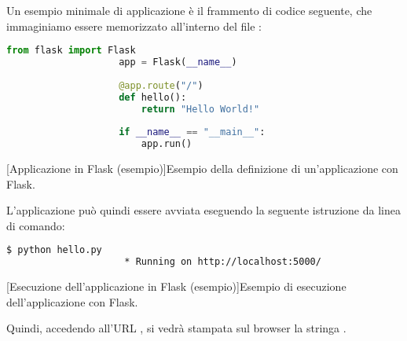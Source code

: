             Un esempio minimale di applicazione è il frammento di codice seguente, che immaginiamo essere memorizzato all'interno del file :
            
            \begin{center}
                \begin{lstlisting}[language=python, gobble=18]
                    from flask import Flask
                    app = Flask(__name__)
                    
                    @app.route("/")
                    def hello():
                        return "Hello World!"
                    
                    if __name__ == "__main__":
                        app.run()
                \end{lstlisting}
                \captionsetup{textformat=empty,labelformat=empty} \vspace{-2em}
                [Applicazione in Flask (esempio)]{Esempio della definizione di un'applicazione con Flask.}
            \end{center}
            
            L'applicazione può quindi essere avviata eseguendo la seguente istruzione da linea di comando:
            
            \begin{center}
                \begin{lstlisting}[language=bash, gobble=18]
                    $ python hello.py
                     * Running on http://localhost:5000/
                \end{lstlisting}
                \captionsetup{textformat=empty,labelformat=empty} \vspace{-2em}
                [Esecuzione dell'applicazione in Flask (esempio)]{Esempio di esecuzione dell'applicazione con Flask.}
            \end{center}
            
            Quindi, accedendo all'\ac{URL} , si vedrà stampata sul browser la stringa .
            
